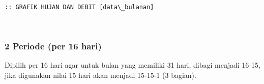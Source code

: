 \documentclass[11pt]{article}
\begin{document}
    \begin{Verbatim}[commandchars=\\\{\}]
:: GRAFIK HUJAN DAN DEBIT [data\_bulanan]
    \end{Verbatim}

    \begin{center}
    \end{center}
    { \hspace*{\fill} \\}
    
    \hypertarget{periode-per-16-hari}{%
\subsubsection{2 Periode (per 16 hari)}\label{periode-per-16-hari}}

Dipilih per 16 hari agar untuk bulan yang memiliki 31 hari, dibagi
menjadi 16-15, jika digunakan nilai 15 hari akan menjadi 15-15-1 (3
bagian).
\end{document}
